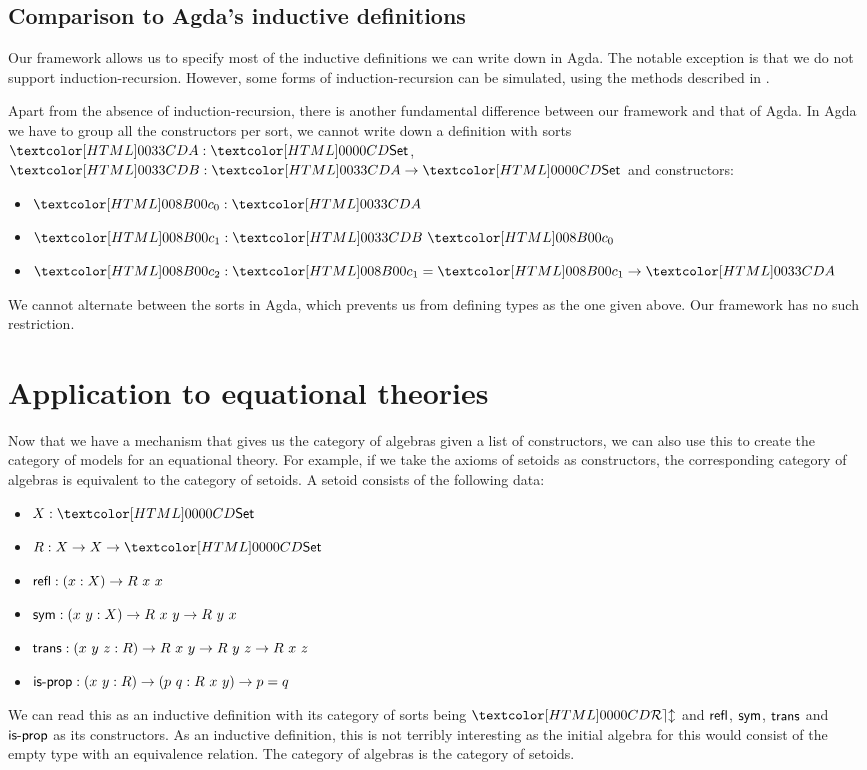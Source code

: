 \subsection{Comparison to Agda's inductive definitions}
Our framework allows us to specify most of the inductive definitions
we can write down in Agda. The notable exception is that we do not
support induction-recursion. However, some forms of
induction-recursion can be simulated, using the methods described in
\cite{Hancock2013}.

Apart from the absence of induction-recursion, there is another
fundamental difference between our framework and that of Agda. In Agda
we have to group all the constructors per sort, \ie we cannot write
down a definition with sorts $\Aty : \Set$, $\Bty : \Aty \to \Set$ and
constructors:
%
\begin{itemize}
\item $\Aco : \Aty$
\item $\Bci : \Bty\ \Aco$
\item $\Acii : \Bci = \Bci \to \Aty$
\end{itemize}
%
We cannot alternate between the sorts in Agda, which prevents us from
defining types as the one given above. Our framework has no such
restriction.

\section{Application to equational theories}
\label{application-to-equational-theories}

Now that we have a mechanism that gives us the category of algebras
given a list of constructors, we can also use this to create the
category of models for an equational theory. For example, if we take
the axioms of setoids as constructors, the corresponding category of
algebras is equivalent to the category of setoids. A setoid consists
of the following data:
\begin{itemize}
\item $X : \Set$
\item $R : X \to X \to \Set$
\item $\ident{refl} : (x : X) \to R\ x\ x$
\item $\ident{sym} : (x\ y : X) \to R\ x\ y \to R\ y\ x$
\item $\ident{trans} : (x\ y\ z : R) \to R\ x\ y \to R\ y\ z \to R\ x\ z$
\item $\ident{is-prop} : (x\ y : R) \to (p\ q : R\ x\ y) \to p = q$
\end{itemize}
We can read this as an inductive definition with its category of sorts
being $\REL$ and $\ident{refl}$, $\ident{sym}$, $\ident{trans}$ and
$\ident{is-prop}$ as its constructors. As an inductive definition,
this is not terribly interesting as the initial algebra for this would
consist of the empty type with an equivalence relation. The category
of algebras is the category of setoids.
